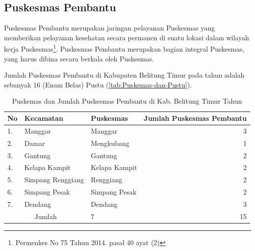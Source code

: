 
\subsection{Puskesmas Pembantu}
Puskesmas Pembantu merupakan jaringan pelayanan Puskesmas yang memberikan pelayanan kesehatan secara permanen di suatu lokasi dalam wilayah kerja Puskesmas\footnote{Permenkes No 75 Tahun 2014. pasal 40 ayat (2)}. Puskesmas  Pembantu merupakan bagian integral  Puskesmas, yang harus dibina secara berkala oleh Puskesmas.

Jumlah Puskesmas Pembantu di Kabupaten Belitung Timur pada tahun \tP adalah sebanyak 16 (Enam Belas) Pustu (\autoref{tab:Puskemas-dan-Pustu}).

\begin{table}[!ht]
\caption{Puskemas dan Jumlah Puskesmas Pembantu di Kab. Belitung Timur Tahun \tP}
\label{tab:Puskemas-dan-Pustu}
\centering{}%

\begin{tabular}{lllr}
	\toprule
	No                    & Kecamatan         & Puskesmas     & Jumlah Puskesmas Pembantu \\
	\midrule
	1.                    & Manggar           & Manggar       &                         3 \\
	\rowcolor{black!10}2. & Damar             & Mengkubang    &                         1 \\
	3.                    & Gantung           & Gantung       &                         2 \\
	\rowcolor{black!10}4. & Kelapa Kampit     & Kelapa Kampit &                         2 \\
	5.                    & Simpang Renggiang & Renggiang     &                         2 \\
	\rowcolor{black!10}6. & Simpang Pesak     & Simpang Pesak &                         2 \\
	7.                    & Dendang           & Dendang       &                         3 \\
	\midrule
	       \multicolumn{2}{c}{Jumlah}         & 7             &                        15 \\
	\bottomrule
\end{tabular}
\end{table}

